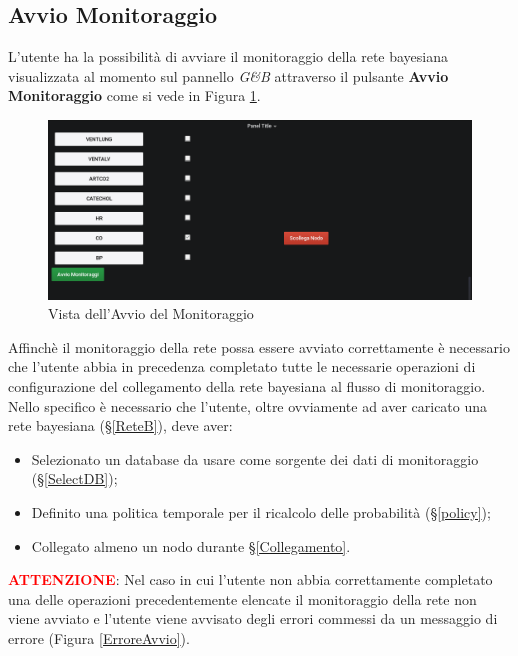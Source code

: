 \subsection{Avvio Monitoraggio}\label{Avvio}

L'utente ha la possibilità di avviare il monitoraggio della rete bayesiana visualizzata al momento sul pannello \textit{G\&B} attraverso il pulsante \textbf{Avvio Monitoraggio} come si vede in Figura \ref{AvvioMonitoraggio}.

\begin{figure}[H]
	\begin{center}
		\includegraphics[scale=0.4]{./images/AvvioMonitoraggio.png}
		 \caption{Vista dell'Avvio del Monitoraggio}	
		 \label{AvvioMonitoraggio}
	\end{center}
\end{figure}

Affinchè il monitoraggio della rete possa essere avviato correttamente è necessario che l'utente abbia in precedenza completato tutte le necessarie operazioni di configurazione del collegamento della rete bayesiana al flusso di monitoraggio.\\
Nello specifico è necessario che l'utente, oltre ovviamente ad aver caricato una rete bayesiana (§\ref{ReteB}), deve aver:
\begin{itemize}
	\item Selezionato un database da usare come sorgente dei dati di monitoraggio (§\ref{SelectDB});
	\item Definito una politica temporale per il ricalcolo delle probabilità (§\ref{policy});
	\item Collegato almeno un nodo durante §\ref{Collegamento}.
\end{itemize} 

\pagebreak

\textbf{\textcolor{red}{ATTENZIONE}}: Nel caso in cui l'utente non abbia correttamente completato una delle operazioni precedentemente elencate il monitoraggio della rete non viene avviato e l'utente viene avvisato degli errori commessi da un messaggio di errore (Figura \ref{ErroreAvvio}).

